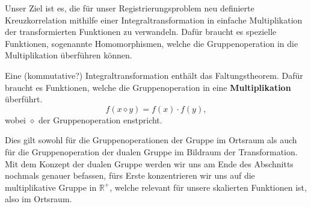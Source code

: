 Unser Ziel ist es, die für unser Registrierungsproblem neu definierte 
Kreuzkorrelation mithilfe einer Integraltransformation in 
einfache Multiplikation der transformierten Funktionen zu verwandeln.
Dafür braucht es spezielle Funktionen, sogenannte Homomorphismen, welche 
die Gruppenoperation in die Multiplikation überführen können. 
\begin{satz}
    \label{buch:papers:mellin:teil2:satz:hom}
    Eine (kommutative?) Integraltransformation enthält das Faltungstheorem.
    Dafür braucht es Funktionen, welche die Gruppenoperation in eine 
    \textbf{Multiplikation} überführt. 
    \[
        f(x \diamond y) 
        = f(x) \cdot f(y)
        ,
    \]
    wobei $\diamond$ der Gruppenoperation enstpricht.
\end{satz}
Dies gilt sowohl für die Gruppenoperationen der Gruppe im Ortsraum als auch 
für die Gruppenoperation der dualen Gruppe im Bildraum der Transformation.
Mit dem Konzept der dualen Gruppe werden wir uns am Ende des Abschnitts 
nochmals genauer befassen, fürs Erste konzentrieren wir uns auf die 
multiplikative Gruppe in $\mathbb{R^+}$, welche relevant für unsere 
skalierten Funktionen ist, also im Ortsraum.
\medskip

